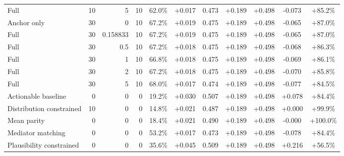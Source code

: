 \begin{table}[htbp]
\begin{tabular}{lrrrccccccc}
Full & 10 & 5 & 10 & 62.0\% & +0.017 & 0.473 & +0.189 & +0.498 & -0.073 & +85.2\% \\
Anchor only & 30 & 0 & 10 & 67.2\% & +0.019 & 0.475 & +0.189 & +0.498 & -0.065 & +87.0\% \\
Full & 30 & 0.158833 & 10 & 67.2\% & +0.019 & 0.475 & +0.189 & +0.498 & -0.065 & +87.0\% \\
Full & 30 & 0.5 & 10 & 67.2\% & +0.018 & 0.475 & +0.189 & +0.498 & -0.068 & +86.3\% \\
Full & 30 & 1 & 10 & 66.8\% & +0.018 & 0.475 & +0.189 & +0.498 & -0.069 & +86.1\% \\
Full & 30 & 2 & 10 & 67.2\% & +0.018 & 0.475 & +0.189 & +0.498 & -0.070 & +85.8\% \\
Full & 30 & 5 & 10 & 68.0\% & +0.017 & 0.474 & +0.189 & +0.498 & -0.077 & +84.5\% \\
Actionable baseline & 0 & 0 & 0 & 19.2\% & +0.030 & 0.507 & +0.189 & +0.498 & +0.078 & +84.4\% \\
Distribution constrained & 10 & 0 & 0 & 14.8\% & +0.021 & 0.487 & +0.189 & +0.498 & +0.000 & +99.9\% \\
Mean parity & 0 & 0 & 0 & 18.4\% & +0.021 & 0.490 & +0.189 & +0.498 & -0.000 & +100.0\% \\
Mediator matching & 0 & 0 & 0 & 53.2\% & +0.017 & 0.473 & +0.189 & +0.498 & -0.078 & +84.4\% \\
Plausibility constrained & 0 & 0 & 0 & 35.6\% & +0.045 & 0.509 & +0.189 & +0.498 & +0.216 & +56.5\% \\
\bottomrule
\end{tabular}
\end{table}